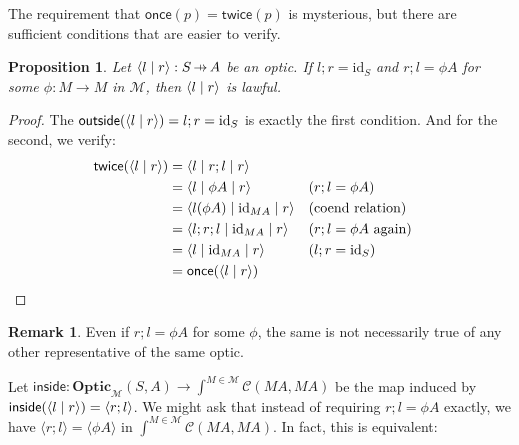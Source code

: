 \documentclass[11pt,a4paper]{article}
\theoremstyle{plain}
\newtheorem{proposition}[theorem]{Proposition}
\theoremstyle{definition}
\newtheorem{remark}[theorem]{Remark}
\newcommand{\C}{\mathscr{C}}
\newcommand{\M}{\mathscr{M}}
\newcommand{\Optic}{\mathbf{Optic}}
\newcommand{\id}{\mathrm{id}}
\newcommand{\rep}[2]{{\ensuremath \left\langle #1 \mid #2 \right\rangle}}
\newcommand{\repthree}[3]{{\ensuremath \langle #1 \mid #2 \mid #3 \rangle}}
\newcommand{\inside}{\mathsf{inside}}
\newcommand{\outside}{\mathsf{outside}}
\newcommand{\once}{\mathsf{once}}
\newcommand{\twice}{\mathsf{twice}}
\newcommand{\hto}{\ensuremath{\,\mathaccent\shortmid\rightarrow\,}}
\begin{document}
The requirement that $\once(p) = \twice(p)$ is mysterious, but there are sufficient conditions that are easier to verify.

\begin{proposition}
  Let $\rep{l}{r } : S \hto A$ be an optic. If $l;r = \id_S$ and $r;l = \phi A$ for some $\phi : M \to M$ in $\M$, then $\rep{l}{r }$ is lawful.
\end{proposition}
\begin{proof}
  The $\outside(\rep{l}{r }) = l;r = \id_S$ is exactly the first condition. And for the second, we verify:
  \begin{align*}
    \twice(\rep{l}{r })
    &= \repthree{l}{r;l}{r } \\
    &= \repthree{l}{\phi A}{r } && \text{($r;l = \phi A$)}\\
    &= \repthree{l (\phi A)}{\id_{MA}}{r } && \text{(coend relation)} \\
    &= \repthree{l;r;l}{\id_{MA}}{r } && \text{($r;l = \phi A$ again)}\\
    &= \repthree{l}{\id_{MA}}{r }  && \text{($l;r = \id_S$)}\\
    &= \once(\rep{l}{r })
  \end{align*}
\end{proof}

\begin{remark}
  Even if $r;l = \phi A$ for some $\phi$, the same is not necessarily true of any other representative of the same optic.
\end{remark}

Let $\inside : \Optic_\M(S, A) \to \int^{M \in \M} \C(M A, M A)$ be the map induced by $\inside(\rep{l}{r }) = \langle r ; l \rangle$. We might ask that instead of requiring $r;l = \phi A$ exactly, we have $\langle r ; l \rangle = \langle \phi A \rangle$ in $\int^{M \in \M} \C(M A, M A)$. In fact, this is equivalent:
\end{document}
